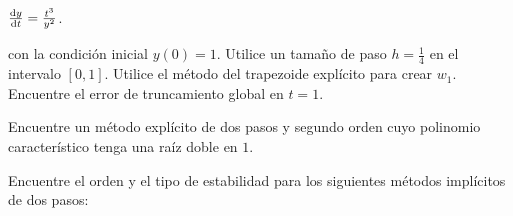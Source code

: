\begin{questions}
\begin{multicols}{3}
\begin{parts}
            \begin{math}
                \diff{y}{t}=
                \frac{t^{3}}{y^{2}}
            \end{math}.
        \end{parts}
    \end{multicols}
    con la condición inicial $y\left(0\right)=1$.
    Utilice un tamaño de paso $h=\frac{1}{4}$ en el intervalo
    $\left[0,1\right]$.
    Utilice el método del trapezoide explícito para crear $w_{1}$.
    Encuentre el error de truncamiento global en $t=1$.

    \question

    Encuentre un método explícito de dos pasos y segundo orden cuyo
    polinomio característico tenga una raíz doble en $1$.

    \question

    Encuentre el orden y el tipo de estabilidad para los siguientes
    métodos implícitos de dos pasos:

\end{questions}
